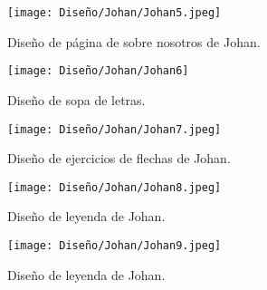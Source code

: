 \begin{figure}[ht!]
  \centering
  \texttt{[image: Diseño/Johan/Johan5.jpeg]}
  \caption{Diseño de página de sobre nosotros de Johan.}
  \label{Johan5}
\end{figure}

\begin{figure}[ht!]
  \centering
  \texttt{[image: Diseño/Johan/Johan6]}
  \caption{Diseño de sopa de letras.}
  \label{Johan6}
\end{figure}

\begin{figure}[ht!]
  \centering
  \texttt{[image: Diseño/Johan/Johan7.jpeg]}
  \caption{Diseño de ejercicios de flechas de Johan.}
  \label{Johan7}
\end{figure}

\begin{figure}[ht!]
  \centering
  \texttt{[image: Diseño/Johan/Johan8.jpeg]}
  \caption{Diseño de leyenda de Johan.}
  \label{Johan8}
\end{figure}

\begin{figure}[ht!]
  \centering
  \texttt{[image: Diseño/Johan/Johan9.jpeg]}
  \caption{Diseño de leyenda de Johan.}
  \label{Johan9}
\end{figure}